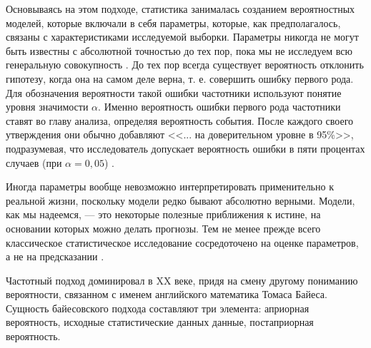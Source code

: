 Основываясь на этом подходе, статистика занималась созданием вероятностных моделей, которые включали в себя параметры, которые, как предполагалось, связаны с характеристиками исследуемой выборки. Параметры никогда не могут быть известны с абсолютной точностью до тех пор, пока мы не исследуем всю генеральную совокупность \cite[стр. 1]{Christensen2010}. До тех пор всегда существует вероятность отклонить гипотезу, когда она на самом деле верна, т. е. совершить ошибку первого рода. Для обозначения вероятности такой ошибки частотники используют понятие уровня значимости $\alpha$. Именно вероятность ошибки первого рода частотники ставят во главу анализа, определяя вероятность события. После каждого своего утверждения они обычно добавляют <<... на доверительном уровне в 95\%>>, подразумевая, что исследователь допускает вероятность ошибки в пяти процентах случаев (при $\alpha = 0,05$) \cite[стр. 10-11]{handbook_stat_dm}.

Иногда параметры вообще невозможно интерпретировать применительно к реальной жизни, поскольку модели редко бывают абсолютно верными. Модели, как мы надеемся, --- это некоторые полезные приближения к истине, на основании которых можно делать прогнозы. Тем не менее прежде всего классическое статистическое исследование сосредоточено на оценке параметров, а не на предсказании \cite[стр. 1]{Christensen2010}.


Частотный подход доминировал в XX веке, придя на смену другому пониманию вероятности, связанном с именем английского математика Томаса Байеса\cite[стр. 2]{Efron2005}. Сущность байесовского подхода составляют три элемента: априорная вероятность, исходные статистические данных данные, постаприорная вероятность.

